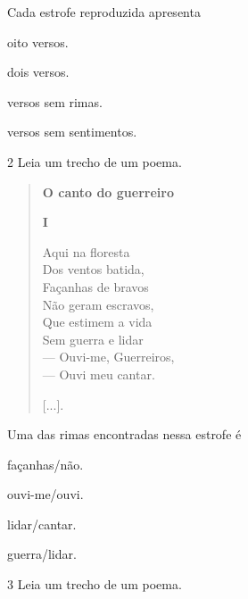 \bigskip

Cada estrofe reproduzida apresenta

\begin{minipage}{.5\textwidth}
\begin{escolha}
\item oito versos.

\item dois versos.

\item versos sem rimas.

\item versos sem sentimentos.
\end{escolha}
\end{minipage}


\bigskip
\bigskip
\bigskip

\num{2} Leia um trecho de um poema.

\begin{verse}
\textbf{O canto do guerreiro}

\textbf{I}

Aqui na floresta\\
Dos ventos batida,\\
Façanhas de bravos\\
Não geram escravos,\\
Que estimem a vida\\
Sem guerra e lidar\\
— Ouvi-me, Guerreiros,\\
— Ouvi meu cantar.

{[}...{]}.

\end{verse}

Uma das rimas encontradas nessa estrofe é

\begin{minipage}{.5\textwidth}
\begin{escolha}
\item façanhas/não.

\item ouvi-me/ouvi.

\item lidar/cantar.

\item guerra/lidar.
\end{escolha}
\end{minipage}


\pagebreak
\num{3} Leia um trecho de um poema.

